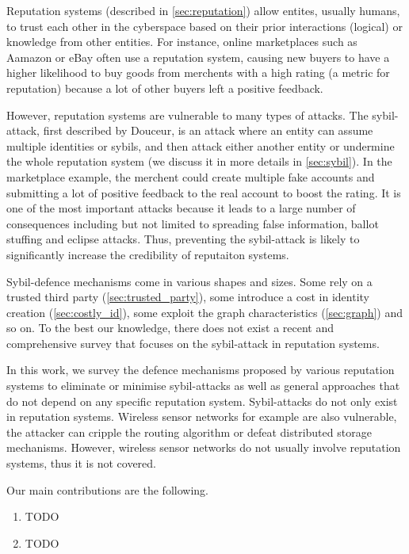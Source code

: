 Reputation systems (described in \autoref{sec:reputation}) allow entites,
usually humans, to trust each other in the cyberspace based on their prior
interactions (logical) or knowledge from other entities. For instance, online
marketplaces such as Aamazon or eBay often use a reputation system, causing new
buyers to have a higher likelihood to buy goods from merchents with a high
rating (a metric for reputation) because a lot of other buyers left a positive
feedback.

However, reputation systems are vulnerable to many types of attacks. The
sybil-attack, first described by Douceur\cite{douceur2002sybil}, is an attack
where an entity can assume multiple identities or sybils, and then attack either
another entity or undermine the whole reputation system (we discuss it in more
details in \autoref{sec:sybil}). In the marketplace example, the merchent could
create multiple fake accounts and submitting a lot of positive feedback to the
real account to boost the rating. It is one of the most important attacks
because it leads to a large number of consequences including but not limited to
spreading false information, ballot stuffing\cite{bhattacharjee2005avoiding} and
eclipse attacks\cite{singh2006eclipse}. Thus, preventing the sybil-attack is
likely to significantly increase the credibility of reputaiton systems.

Sybil-defence mechanisms come in various shapes and sizes. Some rely on a
trusted third party (\autoref{sec:trusted_party}), some introduce a cost in
identity creation (\autoref{sec:costly_id}), some exploit the graph
characteristics (\autoref{sec:graph}) and so on. To the best our knowledge,
there does not exist a recent and comprehensive survey that focuses on the
sybil-attack in reputation systems.

In this work, we survey the defence mechanisms proposed by various reputation
systems to eliminate or minimise sybil-attacks as well as general approaches
that do not depend on any specific reputation system. Sybil-attacks do not only
exist in reputation systems. Wireless sensor networks for example are also
vulnerable, the attacker can cripple the routing algorithm or defeat distributed
storage mechanisms\cite{newsome2004sybil}. However, wireless sensor networks do
not usually involve reputation systems, thus it is not covered.

Our main contributions are the following.
\begin{enumerate}
  \item TODO
  \item TODO
\end{enumerate}


